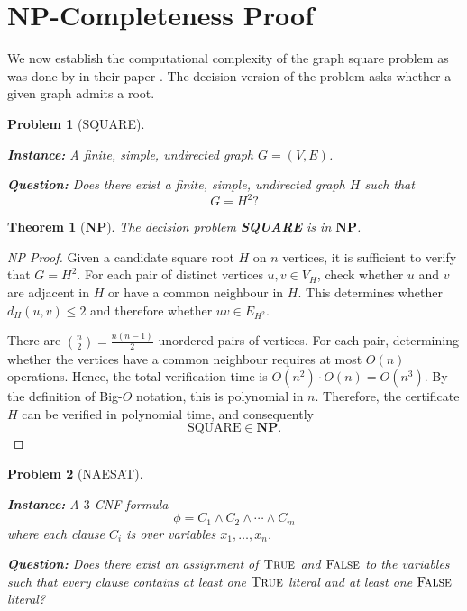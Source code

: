 \documentclass[11pt]{report}
\newtheorem{theorem}{Theorem}
\newtheorem{problem}{Problem}[section]
\begin{document}
\section{NP-Completeness Proof} \label{sec::np_completeness_proof}

We now establish the computational complexity of the graph square problem as was done by \citeauthor{motwani_sudan_1994_roots} in their paper \cite{motwani_sudan_1994_roots}. The decision version of the problem asks whether a given graph admits a root.

\begin{problem}[SQUARE] \label{prob::square_problem}
  \leavevmode

  \textbf{Instance:} A finite, simple, undirected graph $G=(V,E)$.
  \medskip

  \textbf{Question:} Does there exist a finite, simple, undirected graph $H$ such that
  \[
  G = H^2?
  \]
\end{problem}

\begin{theorem}[$\mathbf{NP}$] \label{theorem::np}
  The decision problem \textbf{SQUARE} is in $\mathbf{NP}$. 
\end{theorem}
\begin{proof}[NP Proof]
  Given a candidate square root $H$ on $n$ vertices, it is sufficient to verify that $G=H^2$. For each pair of distinct vertices $u,v\in V_H$, check whether $u$ and $v$ are adjacent in $H$ or have a common neighbour in $H$. This determines whether $d_H(u,v) \leq 2$ and therefore whether $uv \in E_{H^2}$.

  There are $\displaystyle \binom{n}{2}=\frac{n(n-1)}{2}$ unordered pairs of vertices. For each pair, determining whether the vertices have a common neighbour requires at most $O(n)$ operations. Hence, the total verification time is $O(n^2) \cdot O(n) = O(n^3)$.
  By the definition of Big-$O$ notation, this is polynomial in $n$. Therefore, the certificate $H$ can be verified in polynomial time, and consequently
  \[
  \text{SQUARE} \in \mathbf{NP}.
  \]
\end{proof}

\begin{problem}[NAESAT] \label{prob::naesat_problem}
\leavevmode

\textbf{Instance:} A $3$-CNF formula
\[
\phi = C_1 \land C_2 \land \cdots \land C_m
\]
where each clause $C_i$ is over variables $x_1,\ldots,x_n$.

\medskip

\textbf{Question:} Does there exist an assignment of $\textsc{True}$ and $\textsc{False}$ to the variables such that every clause contains at least one $\textsc{True}$ literal and at least one $\textsc{False}$ literal?
\end{problem}
\end{document}
